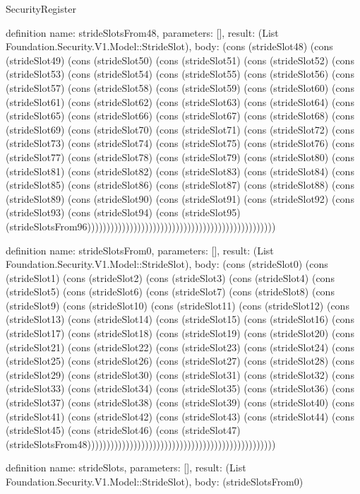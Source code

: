 \begin{lexlean}{SecurityRegister}
\begin{semanticmodule}
definition{
  name: strideSlotsFrom48,
  parameters: [],
  result: (List Foundation.Security.V1.Model::StrideSlot),
  body: (cons (strideSlot48) (cons (strideSlot49) (cons (strideSlot50) (cons (strideSlot51) (cons (strideSlot52) (cons (strideSlot53) (cons (strideSlot54) (cons (strideSlot55) (cons (strideSlot56) (cons (strideSlot57) (cons (strideSlot58) (cons (strideSlot59) (cons (strideSlot60) (cons (strideSlot61) (cons (strideSlot62) (cons (strideSlot63) (cons (strideSlot64) (cons (strideSlot65) (cons (strideSlot66) (cons (strideSlot67) (cons (strideSlot68) (cons (strideSlot69) (cons (strideSlot70) (cons (strideSlot71) (cons (strideSlot72) (cons (strideSlot73) (cons (strideSlot74) (cons (strideSlot75) (cons (strideSlot76) (cons (strideSlot77) (cons (strideSlot78) (cons (strideSlot79) (cons (strideSlot80) (cons (strideSlot81) (cons (strideSlot82) (cons (strideSlot83) (cons (strideSlot84) (cons (strideSlot85) (cons (strideSlot86) (cons (strideSlot87) (cons (strideSlot88) (cons (strideSlot89) (cons (strideSlot90) (cons (strideSlot91) (cons (strideSlot92) (cons (strideSlot93) (cons (strideSlot94) (cons (strideSlot95) (strideSlotsFrom96)))))))))))))))))))))))))))))))))))))))))))))))))
}

definition{
  name: strideSlotsFrom0,
  parameters: [],
  result: (List Foundation.Security.V1.Model::StrideSlot),
  body: (cons (strideSlot0) (cons (strideSlot1) (cons (strideSlot2) (cons (strideSlot3) (cons (strideSlot4) (cons (strideSlot5) (cons (strideSlot6) (cons (strideSlot7) (cons (strideSlot8) (cons (strideSlot9) (cons (strideSlot10) (cons (strideSlot11) (cons (strideSlot12) (cons (strideSlot13) (cons (strideSlot14) (cons (strideSlot15) (cons (strideSlot16) (cons (strideSlot17) (cons (strideSlot18) (cons (strideSlot19) (cons (strideSlot20) (cons (strideSlot21) (cons (strideSlot22) (cons (strideSlot23) (cons (strideSlot24) (cons (strideSlot25) (cons (strideSlot26) (cons (strideSlot27) (cons (strideSlot28) (cons (strideSlot29) (cons (strideSlot30) (cons (strideSlot31) (cons (strideSlot32) (cons (strideSlot33) (cons (strideSlot34) (cons (strideSlot35) (cons (strideSlot36) (cons (strideSlot37) (cons (strideSlot38) (cons (strideSlot39) (cons (strideSlot40) (cons (strideSlot41) (cons (strideSlot42) (cons (strideSlot43) (cons (strideSlot44) (cons (strideSlot45) (cons (strideSlot46) (cons (strideSlot47) (strideSlotsFrom48)))))))))))))))))))))))))))))))))))))))))))))))))
}

definition{
  name: strideSlots,
  parameters: [],
  result: (List Foundation.Security.V1.Model::StrideSlot),
  body: (strideSlotsFrom0)
}


\end{semanticmodule}
\end{lexlean}
